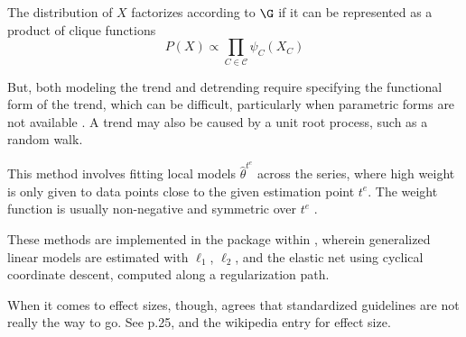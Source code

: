 The distribution of $X$ factorizes according to $\G$ if it can be represented as a product of clique functions \parencites(e.g.,)(){loh2013structure}
\begin{equation} \label{cliqueProd}
    P(X) \propto \prod_{C \in \mathcal{C}} \psi_C (X_C)
\end{equation}

But, both modeling the trend and detrending require specifying the functional form of the trend, which can be difficult, particularly when parametric forms are not available \parencite[e.g.,][]{tan2012time,adolph2008shape,faraway2006glms}. A trend may also be caused by a unit root process, such as a random walk.

This method involves fitting local models $\hat{\theta}^{t^e}$ across the series, where high weight is only given to data points close to the given estimation point $t^e$. The weight function is usually non-negative and symmetric over $t^e$ \parencite[e.g.,][]{zhou2010time}. 


These methods are implemented in the  package within  \parencites(cf.)(){friedman2010bregularization}, wherein generalized linear models are estimated with $\ell_1$, $\ell_2$, and the elastic net using cyclical coordinate descent, computed along a regularization path. 

When it comes to effect sizes, though, \textcite{cohen1988power} agrees that standardized guidelines are not really the way to go. See p.25, and the wikipedia entry for effect size.
